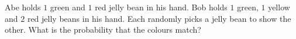 Abe holds $1$ green and $1$ red jelly bean in his hand. Bob holds $1$ green, $1$ yellow and $2$ red jelly beans in his hand. Each randomly picks a jelly bean to show the other. What is the probability that the colours match?
